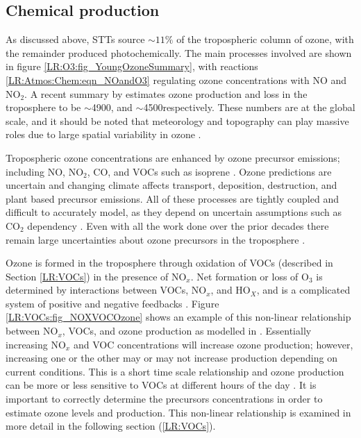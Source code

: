     
  \subsection{Chemical production}
    
    As discussed above, STTs source $\sim 11\%$ of the tropospheric column of ozone, with the remainder produced photochemically.
    The main processes involved are shown in figure \ref{LR:O3:fig_YoungOzoneSummary}, with reactions \ref{LR:Atmos:Chem:eqn_NOandO3} regulating ozone concentrations with NO and NO$_2$.
    A recent summary by \textcite{Young2018} estimates ozone production and loss in the troposphere to be $\sim$4900\tgpyr, and $\sim$4500\tgpyr respectively. 
    These numbers are at the global scale, and it should be noted that meteorology and topography can play massive roles due to large spatial variability in ozone \parencite[eg.][]{Kuang2017}.
    
    Tropospheric ozone concentrations are enhanced by ozone precursor emissions; including NO, NO$_2$, CO, and VOCs such as isoprene \parencite{Atkinson2000, Young2013, Marvin2017}.
    Ozone predictions are uncertain and changing climate affects transport, deposition, destruction, and plant based precursor emissions.
    All of these processes are tightly coupled and difficult to accurately model, as they depend on uncertain assumptions such as CO$_2$ dependency \parencite{Young2013}.
    Even with all the work done over the prior decades there remain large uncertainties about ozone precursors in the troposphere \parencite{Mazzuca2016}.
    
    
    Ozone is formed in the troposphere through oxidation of VOCs (described in Section \ref{LR:VOCs}) in the presence of NO$_x$.
    Net formation or loss of O$_3$ is determined by interactions between VOCs, NO$_x$, and HO$_X$, and is a complicated system of positive and negative feedbacks \parencite{Atkinson2000}.
    Figure \ref{LR:VOCs:fig_NOXVOCOzone} shows an example of this non-linear relationship between NO$_x$, VOCs, and ozone production as modelled in \textcite{Mazzuca2016}.
    Essentially increasing NO$_x$ and VOC concentrations will increase ozone production; however, increasing one or the other may or may not increase production depending on current conditions.
    This is a short time scale relationship and ozone production can be more or less sensitive to VOCs at different hours of the day \parencite{Mazzuca2016}.
    It is important to correctly determine the precursors concentrations in order to estimate ozone levels and production.
    This non-linear relationship is examined in more detail in the following section (\ref{LR:VOCs}).
    
